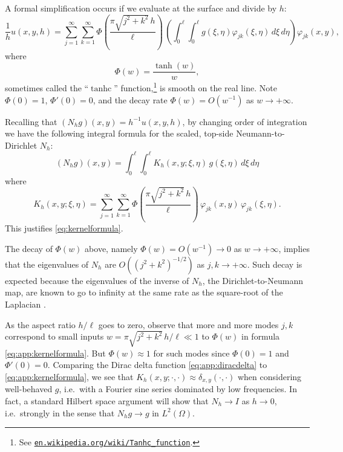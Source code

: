\documentclass[letterpaper,final,12pt,reqno]{amsart}
\theoremstyle{cstyle}
\theoremstyle{cstyle*}
\theoremstyle{dstyle}
\numberwithin{equation}{section}
\begin{document}
A formal simplification occurs if we evaluate at the surface and divide by $h$:
\begin{equation*}
\frac{1}{h} u(x,y,h) = \sum_{j=1}^\infty \sum_{k=1}^\infty \Phi\left(\frac{\pi \sqrt{j^2+k^2}\,h}{\ell}\right) \,\left(\int_0^\ell \int_0^\ell g(\xi,\eta) \varphi_{jk}(\xi,\eta)\,d\xi\,d\eta\right) \varphi_{jk}(x,y),
\end{equation*}
where
    $$\Phi(w) = \frac{\tanh(w)}{w},$$
sometimes called the ``$\operatorname{tanhc}$'' function,\footnote{See \href{https://en.wikipedia.org/wiki/Tanhc_function}{\texttt{en.wikipedia.org/wiki/Tanhc\_function}}.} is smooth on the real line.  Note $\Phi(0)=1$, $\Phi'(0)=0$, and the decay rate $\Phi(w) = O(w^{-1})$ as $w \to +\infty$.

Recalling that $(N_h g)(x,y) = h^{-1} u(x,y,h)$, by changing order of integration we have the following integral formula for the scaled, top-side Neumann-to-Dirichlet $N_h$:
    $$(N_h g)(x,y) = \int_0^\ell \int_0^\ell K_h(x,y;\xi,\eta)\, g(\xi,\eta)\,d\xi\,d\eta$$
where
\begin{equation}
K_h(x,y;\xi,\eta) = \sum_{j=1}^\infty \sum_{k=1}^\infty \Phi\left(\frac{\pi \sqrt{j^2+k^2}\,h}{\ell}\right) \, \varphi_{jk}(x,y) \, \varphi_{jk}(\xi,\eta). \label{eq:app:kernelformula}
\end{equation}
This justifies \eqref{eq:kernelformula}.

The decay of $\Phi(w)$ above, namely $\Phi(w) = O(w^{-1}) \to 0$ as $w\to+\infty$, implies that the eigenvalues of $N_h$ are $O((j^2+k^2)^{-1/2})$ as $j,k \to+\infty$.  Such decay is expected because the eigenvalues of the inverse of $N_h$, the Dirichlet-to-Neumann map, are known to go to infinity at the same rate as the square-root of the Laplacian \cite{Girouardetal2022}.

As the aspect ratio $h/\ell$ goes to zero, observe that more and more modes $j,k$ correspond to small inputs $w=\pi \sqrt{j^2+k^2}\,h/\ell \ll 1$ to $\Phi(w)$ in formula \eqref{eq:app:kernelformula}.  But $\Phi(w)\approx 1$ for such modes since $\Phi(0)=1$ and $\Phi'(0)=0$.  Comparing the Dirac delta function \eqref{eq:app:diracdelta} to \eqref{eq:app:kernelformula}, we see that $K_h(x,y;\cdot,\cdot) \approx \delta_{x,y}(\cdot,\cdot)$ when considering well-behaved $g$, i.e.~with a Fourier sine series dominated by low frequencies.  In fact, a standard Hilbert space argument will show that $N_h \to I$ as $h\to 0$, i.e.~strongly in the sense that $N_h g \to g$ in $L^2(\Omega)$.
\end{document}
